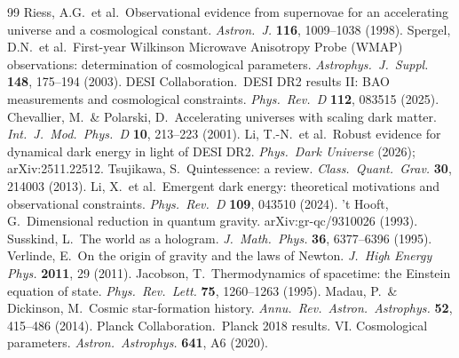 \documentclass[12pt,a4paper]{article}
\begin{document}
\begin{thebibliography}{99}
 Riess, A.G.\ et al.\ Observational evidence from supernovae for an accelerating universe and a cosmological constant. {\it Astron.\ J.} {\bf 116}, 1009--1038 (1998).
 Spergel, D.N.\ et al.\ First-year Wilkinson Microwave Anisotropy Probe (WMAP) observations: determination of cosmological parameters. {\it Astrophys.\ J.\ Suppl.} {\bf 148}, 175--194 (2003).
 DESI Collaboration.\ DESI DR2 results II: BAO measurements and cosmological constraints. {\it Phys.\ Rev.\ D} {\bf 112}, 083515 (2025).
 Chevallier, M.\ \& Polarski, D.\ Accelerating universes with scaling dark matter. {\it Int.\ J.\ Mod.\ Phys.\ D} {\bf 10}, 213--223 (2001).
 Li, T.-N.\ et al.\ Robust evidence for dynamical dark energy in light of DESI DR2. {\it Phys.\ Dark Universe} (2026); arXiv:2511.22512.
 Tsujikawa, S.\ Quintessence: a review. {\it Class.\ Quant.\ Grav.} {\bf 30}, 214003 (2013).
 Li, X.\ et al.\ Emergent dark energy: theoretical motivations and observational constraints. {\it Phys.\ Rev.\ D} {\bf 109}, 043510 (2024).
 't Hooft, G.\ Dimensional reduction in quantum gravity. arXiv:gr-qc/9310026 (1993).
 Susskind, L.\ The world as a hologram. {\it J.\ Math.\ Phys.} {\bf 36}, 6377--6396 (1995).
 Verlinde, E.\ On the origin of gravity and the laws of Newton. {\it J.\ High Energy Phys.} {\bf 2011}, 29 (2011).
 Jacobson, T.\ Thermodynamics of spacetime: the Einstein equation of state. {\it Phys.\ Rev.\ Lett.} {\bf 75}, 1260--1263 (1995).
 Madau, P.\ \& Dickinson, M.\ Cosmic star-formation history. {\it Annu.\ Rev.\ Astron.\ Astrophys.} {\bf 52}, 415--486 (2014).
 Planck Collaboration.\ Planck 2018 results. VI. Cosmological parameters. {\it Astron.\ Astrophys.} {\bf 641}, A6 (2020).
\end{thebibliography}
\end{document}
